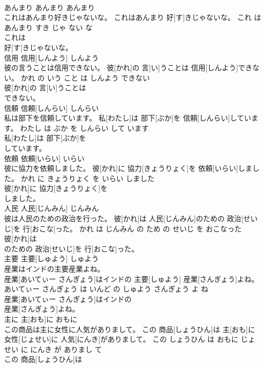\documentclass[8pt]{extreport}
\begin{document}
\begin{CJK}{UTF8}{min}
\\	あんまり	あんまり	あんまり	
\\	これはあんまり好きじゃないな。	これはあんまり 好[す]きじゃないな。	これ は あんまり すき じゃ ない な	
\\	これは
\\	好[す]きじゃないな。			
\\	信用	信用[しんよう]	しんよう	
\\	彼の言うことは信用できない。	彼[かれ]の 言[い]うことは 信用[しんよう]できない。	かれ の いう こと は しんよう できない	
\\	彼[かれ]の 言[い]うことは
\\	できない。			
\\	信頼	信頼[しんらい]	しんらい	
\\	私は部下を信頼しています。	私[わたし]は 部下[ぶか]を 信頼[しんらい]しています。	わたし は ぶか を しんらい して います	
\\	私[わたし]は 部下[ぶか]を
\\	しています。			
\\	依頼	依頼[いらい]	いらい	
\\	彼に協力を依頼しました。	彼[かれ]に 協力[きょうりょく]を 依頼[いらい]しました。	かれ に きょうりょく を いらい しました	
\\	彼[かれ]に 協力[きょうりょく]を
\\	しました。			
\\	人民	人民[じんみん]	じんみん	
\\	彼は人民のための政治を行った。	彼[かれ]は 人民[じんみん]のための 政治[せいじ]を 行[おこな]った。	かれ は じんみん の ため の せいじ を おこなった	
\\	彼[かれ]は
\\	のための 政治[せいじ]を 行[おこな]った。			
\\	主要	主要[しゅよう]	しゅよう	
\\	産業はインドの主要産業よね。	
\\	産業[あいてぃー さんぎょう]はインドの 主要[しゅよう] 産業[さんぎょう]よね。	あいてぃー さんぎょう は いんど の しゅよう さんぎょう よ ね	
\\	産業[あいてぃー さんぎょう]はインドの
\\	産業[さんぎょう]よね。			
\\	主に	主[おも]に	おもに	
\\	この商品は主に女性に人気がありまして。	この 商品[しょうひん]は 主[おも]に 女性[じょせい]に 人気[にんき]がありまして。	この しょうひん は おもに じょせい に にんき が ありまし て	
\\	この 商品[しょうひん]は

\end{CJK}
\end{document}

